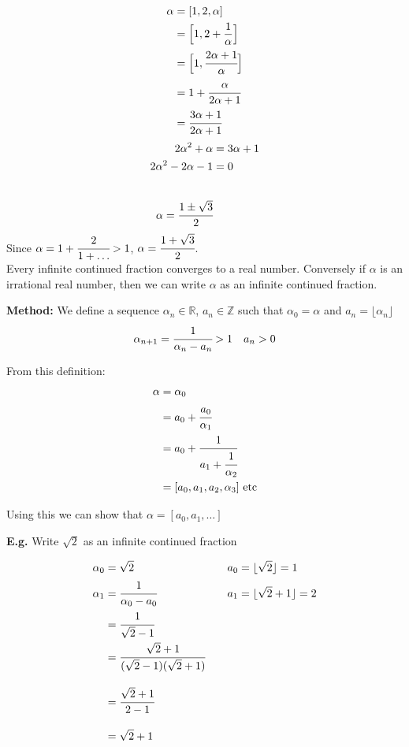 \documentclass[11pt]{article}
\begin{document}
\begin{align*}
	\alpha &= [1,2,\alpha]\\
	&= \Big[1,2 + \frac{1}{\alpha}\Big]\\
	&= \Big[1, \cfrac{2\alpha+1}{\alpha}\Big]\\
	&= 1 + \cfrac{\alpha}{2\alpha+1}\\
	&= \cfrac{3\alpha + 1}{2\alpha + 1}
\end{align*}
\begin{align*}
	2\alpha^2 + \alpha &= 3\alpha + 1\\
	2\alpha^2 - 2\alpha - 1 &= 0\\[2em]
	\alpha = \cfrac{1\pm \sqrt3}{2}
\end{align*}
Since $\alpha = 1 + \cfrac{2}{1+ \dots} > 1 $, $\alpha = \cfrac{1+\sqrt 3}{2}$.\\[1em]
$ $\\
Every infinite continued fraction converges to a real number. Conversely if $\alpha$ is an irrational real number, then we can write $\alpha$ as an infinite continued fraction.




$ $ \\
\textbf{Method: } We define a sequence $\alpha_n \in \mathbb{R} $, $ a_n \in \mathbb{Z} $ such that $\alpha_0 = \alpha $ and $a_n = \lfloor\alpha_n \rfloor$
\begin{align*}
	\alpha_{n+1} = \cfrac{1}{\alpha_n - a_n} > 1&& a_n>0
\end{align*}

From this definition:
\begin{align*}
	\alpha &= \alpha_0\\
	&=a_0 + \cfrac{a_0}{\alpha_1}\\
	&= a_0 + \cfrac{1}{a_1 + \cfrac{1}{\alpha_2}}\\
	&= [a_0, a_1, a_2, \alpha_3] \text{ etc}
\end{align*}

Using this we can show that $\alpha = [a_0,a_1, \dots]$

\textbf{E.g.} Write $\sqrt{2}$ as an infinite continued fraction




\begin{align*}
	\alpha_0 &= \sqrt2 &&&& a_0 =\lfloor \sqrt{2} \rfloor = 1\\
	\alpha_1 &= \cfrac{1}{\alpha_0 - a_0 } &&&& a_1 = \lfloor \sqrt{2}  +1 \rfloor = 2\\
	& = \cfrac{1}{\sqrt{2}-1}\\
	& = \cfrac{\sqrt{2}+1}{(\sqrt{2}-1)(\sqrt{2}+1)}&\\[1em]
	& = \cfrac{\sqrt{2}+1}{2-1}\\[1em]
	& = \sqrt{2}+1
\end{align*}
\end{document}
